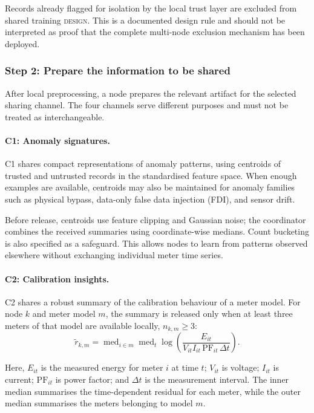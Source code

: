 \documentclass[11pt,a4paper]{article}
\newcommand{\design}{\textcolor{emorange}{\textsc{design}}}
\begin{document}
Records already flagged for isolation by the local trust layer are
excluded from shared training \design{}. This is a documented design
rule and should not be interpreted as proof that the complete
multi-node exclusion mechanism has been deployed.

\subsubsection{Step 2: Prepare the information to be shared}

After local preprocessing, a node prepares the relevant artifact for
the selected sharing channel. The four channels serve different
purposes and must not be treated as interchangeable.

\paragraph{C1: Anomaly signatures.}

C1 shares compact representations of anomaly patterns, using centroids
of trusted and untrusted records in the standardised feature space.
When enough examples are available, centroids may also be maintained
for anomaly families such as physical bypass, data-only false data
injection (FDI), and sensor drift.

Before release, centroids use feature clipping and Gaussian noise;
the coordinator combines the received summaries using coordinate-wise
medians. Count bucketing is also specified as a safeguard. This allows
nodes to learn from patterns observed elsewhere without exchanging
individual meter time series.

\paragraph{C2: Calibration insights.}

C2 shares a robust summary of the calibration behaviour of a meter
model. For node $k$ and meter model $m$, the summary is released only
when at least three meters of that model are available locally,
$n_{k,m}\geq 3$:
\begin{equation}
\widetilde r_{k,m}
=
\operatorname{med}_{i\in m}
\operatorname{med}_{t}
\log\!\left(
\frac{E_{it}}
{V_{it} I_{it}\,\mathrm{PF}_{it}\,\Delta t}
\right).
\label{eq:protocol-calibration-local}
\end{equation}

Here, $E_{it}$ is the measured energy for meter $i$ at time $t$;
$V_{it}$ is voltage; $I_{it}$ is current; $\mathrm{PF}_{it}$ is
power factor; and $\Delta t$ is the measurement interval. The inner
median summarises the time-dependent residual for each meter, while
the outer median summarises the meters belonging to model $m$.
\end{document}
